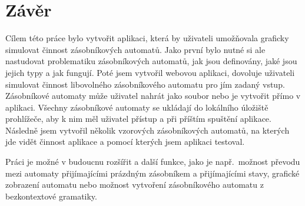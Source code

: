 \chapter{Závěr}\label{chap:Conclusion}

Cílem této práce bylo vytvořit aplikaci, která by uživateli umožňovala graficky simulovat činnost zásobníkových automatů. Jako první bylo nutné si ale nastudovat problematiku zásobníkových automatů, jak jsou definovány, jaké jsou jejich typy a jak fungují. Poté jsem vytvořil webovou aplikaci, dovoluje uživateli simulovat činnost libovolného zásobníkového automatu pro jím zadaný vstup. Zásobníkové automaty může uživatel nahrát jako soubor nebo je vytvořit přímo v aplikaci. Všechny zásobníkové automaty se ukládají do lokálního úložiště prohlížeče, aby k nim měl uživatel přístup a při příštím spuštění aplikace. Následně jsem vytvořil několik vzorových zásobníkových automatů, na kterých jde vidět činnost aplikace a pomocí kterých jsem aplikaci testoval.

Práci je možné v budoucnu rozšířit a další funkce, jako je např.\ možnost převodu mezi automaty přijímajícími prázdným zásobníkem a přijímajícími stavy, grafické zobrazení automatu nebo možnost vytvoření zásobníkového automatu z bezkontextové gramatiky.
\endinput